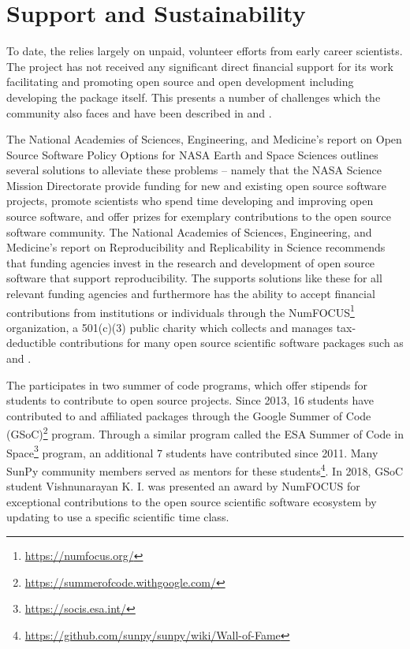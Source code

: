 \section{Support and Sustainability}
\label{sec:support}

To date, the \sunpyproj relies largely on unpaid, volunteer efforts from early career scientists.
The project has not received any significant direct financial support for its work facilitating and promoting open source and open development including developing the \sunpypkg package itself.
This presents a number of challenges which the \astropy community also faces and have been described in \cite{PriceWhelan:2018ji} and \cite{Muna2016}.

The National Academies of Sciences, Engineering, and Medicine's report on Open Source Software Policy Options for NASA Earth and Space Sciences \citep{NAP2018} outlines several solutions to alleviate these problems -- namely that the NASA Science Mission Directorate provide funding for new and existing open source software projects, promote scientists who spend time developing and improving open source software, and offer prizes for exemplary contributions to the open source software community.
The National Academies of Sciences, Engineering, and Medicine's report on Reproducibility and Replicability in Science \citep{NAP2019} recommends that funding agencies invest in the research and development of open source software that support reproducibility.
The \sunpyproj supports solutions like these for all relevant funding agencies and furthermore has the ability to accept financial contributions from institutions or individuals through the NumFOCUS\footnote{\url{https://numfocus.org/}} organization, a 501(c)(3) public charity which collects and manages tax-deductible contributions for many open source scientific software packages such as \numpy and \astropy.

The \sunpyproj participates in two summer of code programs, which offer stipends for students to contribute to open source projects.
Since 2013, 16 students have contributed to \sunpypkg and affiliated packages through the Google Summer of Code (GSoC)\footnote{\url{https://summerofcode.withgoogle.com/}} program.
Through a similar program called the ESA Summer of Code in Space\footnote{\url{https://socis.esa.int/}} program, an additional 7 students have contributed since 2011.
Many SunPy community members served as mentors for these students\footnote{\url{https://github.com/sunpy/sunpy/wiki/Wall-of-Fame}}.
In 2018, GSoC student Vishnunarayan K. I. was presented an award by NumFOCUS for exceptional contributions to the open source scientific software ecosystem by updating \sunpypkg to use a specific scientific time class.

